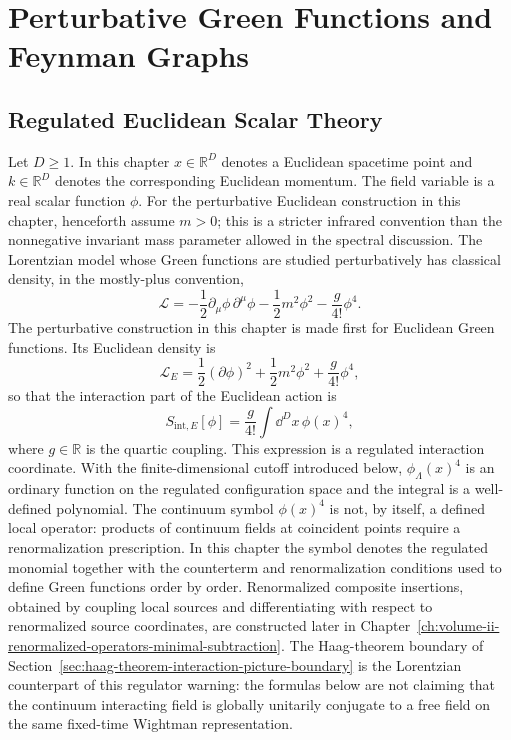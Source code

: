 \chapter{Perturbative Green Functions and Feynman Graphs}
\label{ch:perturbative-green-functions}
\ConventionsMixed


\section{Regulated Euclidean Scalar Theory}

\begin{definition}
\label{def:regulated-euclidean-phi-four-datum}
Let \(D\ge1\). In this chapter \(x\in\mathbb R^D\) denotes a Euclidean
spacetime point and \(k\in\mathbb R^D\) denotes the corresponding Euclidean
momentum. The field variable is a real scalar function \(\phi\). For the
perturbative Euclidean construction in this chapter, henceforth assume
\(m>0\); this is a stricter infrared convention than the nonnegative invariant
mass parameter allowed in the spectral discussion. The
Lorentzian model whose Green functions are studied perturbatively has classical
density, in the mostly-plus convention,
\[
  \mathcal L
  =
  -\frac{1}{2}\partial_\mu\phi\,\partial^\mu\phi
  -\frac{1}{2}m^2\phi^2
  -\frac{g}{4!}\phi^4 .
\]
The perturbative construction in this chapter is made first for Euclidean
Green functions. Its Euclidean density is
\[
  \mathcal L_E
  =
  \frac{1}{2}(\partial\phi)^2
  +\frac{1}{2}m^2\phi^2
  +\frac{g}{4!}\phi^4 ,
\]
so that the interaction part of the Euclidean action is
\[
  S_{\mathrm{int},E}[\phi]
  =
  \frac{g}{4!}\int\dd^D x\,\phi(x)^4 ,
\]
where \(g\in\mathbb R\) is the quartic coupling.  This expression is a
regulated interaction coordinate.  With the finite-dimensional cutoff
introduced below, \(\phi_\Lambda(x)^4\) is an ordinary function on the regulated
configuration space and the integral is a well-defined polynomial.  The
continuum symbol \(\phi(x)^4\) is not, by itself, a defined local operator:
products of continuum fields at coincident points require a renormalization
prescription.  In this chapter the symbol denotes the regulated monomial
together with the counterterm and renormalization conditions used to define
Green functions order by order.  Renormalized composite insertions, obtained by
coupling local sources and differentiating with respect to renormalized source
coordinates, are constructed later in
Chapter~\ref{ch:volume-ii-renormalized-operators-minimal-subtraction}.
The Haag-theorem boundary of
Section~\ref{sec:haag-theorem-interaction-picture-boundary} is the Lorentzian
counterpart of this regulator warning: the formulas below are not claiming that
the continuum interacting field is globally unitarily conjugate to a free field
on the same fixed-time Wightman representation.


\end{definition}
